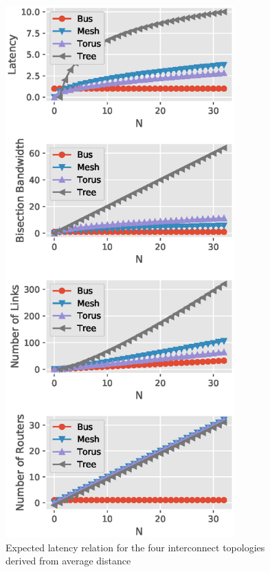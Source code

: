 \documentclass[journal,10pt,twoside, a4paper]{IEEEtran}
\begin{document}
\begin{figure}
    \centering
    \includegraphics[width = 250pt]{expectations.eps}
    \caption{Expected latency relation for the four interconnect topologies derived from average distance}
    \label{fig:lat}
\end{figure}
\end{document}
